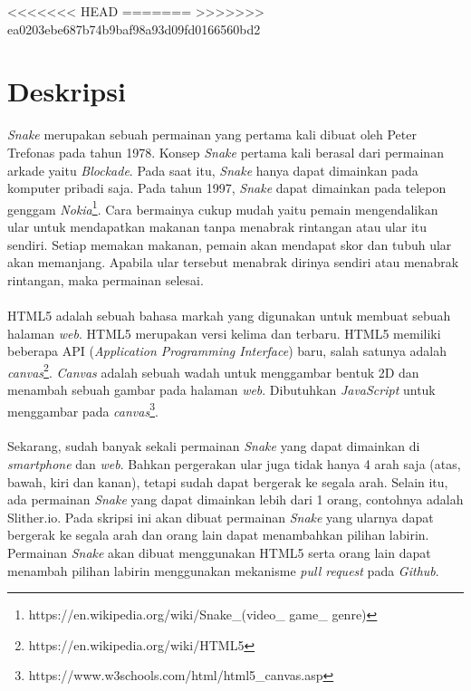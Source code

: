 \documentclass[a4paper,twoside]{article}
\begin{document}
\title{\@judultopik}
\author{\nama \textendash \@npm} 

\newcommand{\nama}{Evelyn Wijaya}
\newcommand{\@npm}{2015730030}
\newcommand{\@judultopik}{Open Source Snake 360} %
\newcommand{\jumpemb}{1} %
<<<<<<< HEAD
\newcommand{\tanggal}{07/09/2018}
=======
\newcommand{\tanggal}{01/01/1900}
>>>>>>> ea0203ebe687b74b9baf98a93d09fd0166560bd2


\maketitle


\section{Deskripsi}
\textit{Snake} merupakan sebuah permainan yang pertama kali dibuat oleh Peter Trefonas pada tahun 1978. Konsep \textit{Snake} pertama kali berasal dari permainan arkade yaitu \textit{Blockade}. Pada saat itu, \textit{Snake} hanya dapat dimainkan pada komputer pribadi saja. Pada tahun 1997, \textit{Snake} dapat dimainkan pada telepon genggam \textit{Nokia}\footnote{https://en.wikipedia.org/wiki/Snake\_(video\_ game\_ genre)}. Cara bermainya cukup mudah yaitu pemain mengendalikan ular untuk mendapatkan makanan tanpa menabrak rintangan atau ular itu sendiri. Setiap memakan makanan, pemain akan mendapat skor dan tubuh ular akan memanjang. Apabila ular tersebut menabrak dirinya sendiri atau menabrak rintangan, maka permainan selesai.\\\\
HTML5 adalah sebuah bahasa markah yang digunakan untuk membuat sebuah halaman \textit{web}. HTML5 merupakan versi kelima dan terbaru. HTML5 memiliki beberapa API (\textit{Application Programming Interface}) baru, salah satunya adalah \textit{canvas}\footnote{https://en.wikipedia.org/wiki/HTML5}. \textit{Canvas} adalah sebuah wadah untuk menggambar bentuk 2D dan menambah sebuah gambar pada halaman \textit{web}. Dibutuhkan \textit{JavaScript} untuk menggambar pada \textit{canvas}\footnote{https://www.w3schools.com/html/html5\_canvas.asp}.\\\\
Sekarang, sudah banyak sekali permainan \textit{Snake} yang dapat dimainkan di \textit{smartphone} dan \textit{web}. Bahkan pergerakan ular juga tidak hanya 4 arah saja (atas, bawah, kiri dan kanan), tetapi sudah dapat bergerak ke segala arah. Selain itu, ada permainan \textit{Snake} yang dapat dimainkan lebih dari 1 orang, contohnya adalah Slither.io. Pada skripsi ini akan dibuat permainan \textit{Snake} yang ularnya dapat bergerak ke segala arah dan orang lain dapat menambahkan pilihan labirin. Permainan \textit{Snake} akan dibuat menggunakan HTML5 serta orang lain dapat menambah pilihan labirin menggunakan mekanisme \textit{pull request} pada \textit{Github}.
\end{document}

